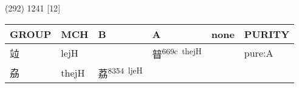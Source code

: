 \documentclass[14pt,a4paper]{scrartcl}
\begin{document}
(292) 1241 {[}12{]}

\begin{longtable}[c]{@{}llllll@{}}
\toprule
\begin{minipage}[b]{0.14\columnwidth}\raggedright\strut
GROUP
\strut\end{minipage} &
\begin{minipage}[b]{0.14\columnwidth}\raggedright\strut
MCH
\strut\end{minipage} &
\begin{minipage}[b]{0.14\columnwidth}\raggedright\strut
B
\strut\end{minipage} &
\begin{minipage}[b]{0.14\columnwidth}\raggedright\strut
A
\strut\end{minipage} &
\begin{minipage}[b]{0.14\columnwidth}\raggedright\strut
none
\strut\end{minipage} &
\begin{minipage}[b]{0.14\columnwidth}\raggedright\strut
PURITY
\strut\end{minipage}\tabularnewline
\midrule
\endhead
\begin{minipage}[t]{0.14\columnwidth}\raggedright\strut
竝
\strut\end{minipage} &
\begin{minipage}[t]{0.14\columnwidth}\raggedright\strut
lejH
\strut\end{minipage} &
\begin{minipage}[t]{0.14\columnwidth}\raggedright\strut
\strut\end{minipage} &
\begin{minipage}[t]{0.14\columnwidth}\raggedright\strut
暜\textsuperscript{669c~thejH}
\strut\end{minipage} &
\begin{minipage}[t]{0.14\columnwidth}\raggedright\strut
\strut\end{minipage} &
\begin{minipage}[t]{0.14\columnwidth}\raggedright\strut
pure:A
\strut\end{minipage}\tabularnewline
\begin{minipage}[t]{0.14\columnwidth}\raggedright\strut
劦
\strut\end{minipage} &
\begin{minipage}[t]{0.14\columnwidth}\raggedright\strut
thejH
\strut\end{minipage} &
\begin{minipage}[t]{0.14\columnwidth}\raggedright\strut
荔\textsuperscript{8354~ljeH}

\end{minipage}
\end{longtable}
\end{document}
